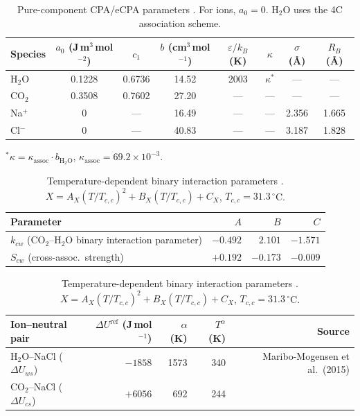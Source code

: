 \documentclass[preprint,12pt,authoryear]{elsarticle}
\begin{document}
\begin{table}[H]
  \centering
  \caption{Pure-component CPA/eCPA parameters \citep{Coelho2025}.
           For ions, $a_0 = 0$. H$_2$O uses the 4C association scheme.}
  \label{tab:pure_params}
  \begin{tabular}{lccccccc}
    \toprule
    Species & $a_0$ (J\,m$^3$\,mol$^{-2}$) & $c_1$ & $b$ (cm$^3$\,mol$^{-1}$) &
              $\varepsilon/k_B$ (K) & $\kappa$ & $\sigma$ (\AA) & $R_B$ (\AA) \\
    \midrule
    H$_2$O & 0.1228 & 0.6736 & 14.52 & 2003 & $\kappa^*$ & ---   & ---   \\
    CO$_2$  & 0.3508 & 0.7602 & 27.20 & ---  & ---        & ---   & ---   \\
    Na$^+$  & 0      & ---    & 16.49 & ---  & ---        & 2.356 & 1.665 \\
    Cl$^-$  & 0      & ---    & 40.83 & ---  & ---        & 3.187 & 1.828 \\
    \bottomrule
  \end{tabular}
  \begin{flushleft}
    \footnotesize $^*\kappa = \kappa_{\text{assoc}} \cdot b_{\text{H}_2\text{O}}$,
    $\kappa_{\text{assoc}} = 69.2 \times 10^{-3}$.
  \end{flushleft}
\end{table}

\begin{table}[H]
  \centering
  \caption{Temperature-dependent binary interaction parameters \citep{Coelho2025}.
           $X = A_X(T/T_{c,c})^2 + B_X(T/T_{c,c}) + C_X$, $T_{c,c} = 31.3\,^\circ$C.}
  \label{tab:binary_params}
  \begin{tabular}{lrrr}
    \toprule
    Parameter & $A$ & $B$ & $C$ \\
    \midrule
    $k_{cw}$ (CO$_2$--H$_2$O binary interaction parameter) & $-0.492$ & $2.101$ & $-1.571$ \\
    $S_{cw}$ (cross-assoc.\ strength) & $+0.192$ & $-0.173$ & $-0.009$ \\
    \bottomrule
  \end{tabular}

  \vspace{6pt}
  \begin{tabular}{lrrrr}
    \toprule
    Ion--neutral pair & $\Delta U^{\text{ref}}$ (J\,mol$^{-1}$) & $\alpha$ (K) & $T^\alpha$ (K) & Source \\
    \midrule
    H$_2$O--NaCl ($\Delta U_{ws}$) & $-1858$ & 1573 & 340 & Maribo-Mogensen et al.\ (2015) \\
    CO$_2$--NaCl ($\Delta U_{cs}$) & $+6056$ & 692  & 244 & \citet{Coelho2025} \\
    \bottomrule
  \end{tabular}
\end{table}
\end{document}
